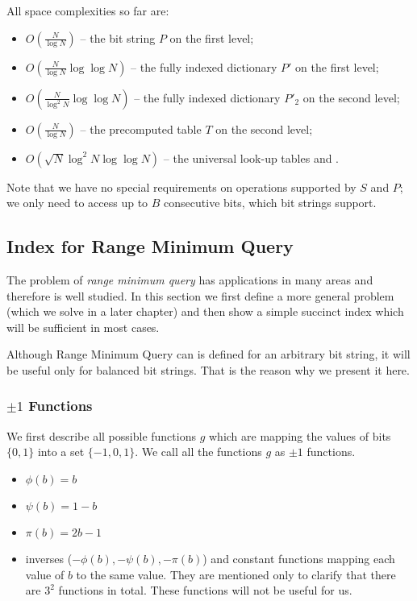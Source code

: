 \bigskip

All space complexities so far are:
\begin{itemize}
	\item $O(\frac{N}{\log N})$ -- the bit string $P$ on the first level;
	\item $O(\frac{N}{\log N}\log \log N)$ -- the fully indexed dictionary $P'$ on the first level;
	\item $O(\frac{N}{\log^2 N}\log \log N)$ -- the fully indexed dictionary $P'_2$ on the second level;
	\item $O(\frac{N}{\log N})$ -- the precomputed table $T$ on the second level;
	\item $O(\sqrt{N}\log^2 N \log\log N)$ -- the universal look-up tables \fwdSearch{} and \bwdSearch{}.
\end{itemize}
Note that we have no special requirements on operations supported by $S$ and $P$; we only need to access up to $B$ consecutive bits, which bit strings support.

\subsection{Index for Range Minimum Query}

The problem of \emph{range minimum query} has applications in many areas and therefore is well studied. 
In this section we first define a more general problem (which we solve in a later chapter) and then show a simple succinct index which will be sufficient in most cases.

Although Range Minimum Query can is defined for an arbitrary bit string, it will be useful only for balanced bit strings.
That is the reason why we present it here.

\subsubsection{$\pm 1$ Functions}\label{ss:rmq-def}

We first describe all possible functions $g$ which are mapping the values of bits $\{0, 1\}$ into a set $\{-1, 0, 1\}$.
We call all the functions $g$ as $\pm 1$ functions.
\begin{itemize}
	\item $\phi(b) = b$
	\item $\psi(b) = 1 - b$
	\item $\pi(b) = 2 b - 1$
	\item inverses ($-\phi(b), -\psi(b), -\pi(b)$) and constant functions mapping each value of $b$ to the same value.
	They are mentioned only to clarify that there are $3^2$ functions in total.
	These functions will not be useful for us.
\end{itemize}

